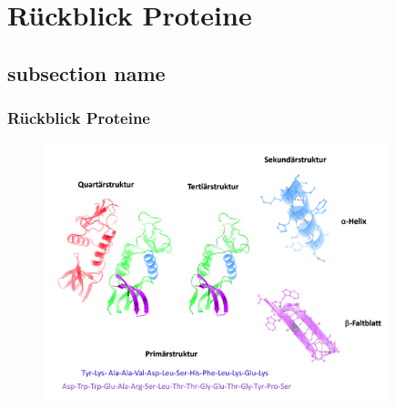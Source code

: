 \section[Protein]{Rückblick Proteine} %
\label{sec:wiederholung_proteine}
\subsection*{subsection name} %
\label{sub:subsection_name}

\begin{frame}
	\frametitle{Rückblick Proteine}
	\begin{figure}
		\includegraphics[width = 10cm]{pic/Protein-Struktur.png}
	\end{figure}
\end{frame}